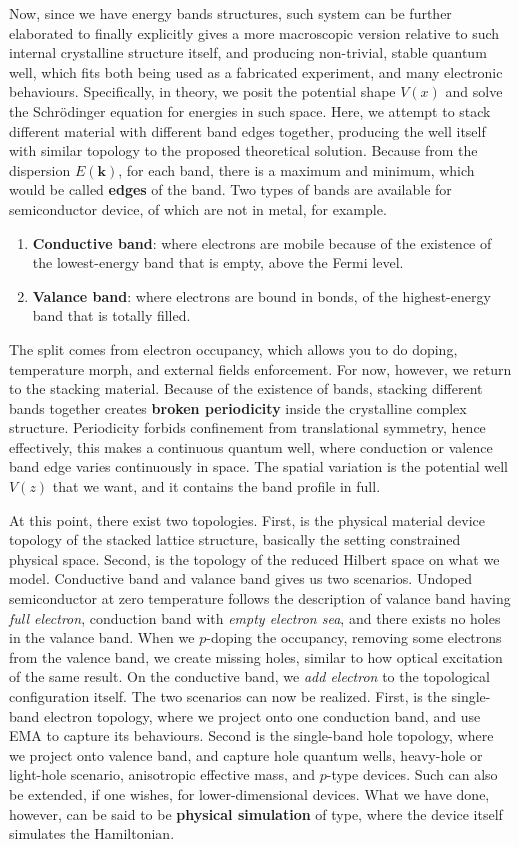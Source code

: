 \documentclass[%
 reprint,
 amsmath,amssymb,
 aps,
]{revtex4-2}
\begin{document}
Now, since we have energy bands structures, such system can be further elaborated to finally explicitly gives a more macroscopic version relative to such internal crystalline structure itself, and producing non-trivial, stable quantum well, which fits both being used as a fabricated experiment, and many electronic behaviours. Specifically, in theory, we posit the potential shape $V(x)$ and solve the Schrödinger equation for energies in such space. Here, we attempt to stack different material with different band edges together, producing the well itself with similar topology to the proposed theoretical solution. Because from the dispersion $E(\mathbf{k})$, for each band, there is a maximum and minimum, which would be called \textbf{edges} of the band. Two types of bands are available for semiconductor device, of which are not in metal, for example. 
\begin{enumerate}[itemsep=1pt,topsep=1pt]
    \item \textbf{Conductive band}: where electrons are mobile because of the existence of the lowest-energy band that is empty, above the Fermi level. 
    \item \textbf{Valance band}: where electrons are bound in bonds, of the highest-energy band that is totally filled. 
\end{enumerate}
The split comes from electron occupancy, which allows you to do doping, temperature morph, and external fields enforcement. For now, however, we return to the stacking material. Because of the existence of bands, stacking different bands together creates \textbf{broken periodicity} inside the crystalline complex structure. Periodicity forbids confinement from translational symmetry, hence effectively, this makes a continuous quantum well, where conduction or valence band edge varies continuously in space. The spatial variation is the potential well $V(z)$ that we want, and it contains the band profile in full. 

At this point, there exist two topologies. First, is the physical material device topology of the stacked lattice structure, basically the setting constrained physical space. Second, is the topology of the reduced Hilbert space on what we model. Conductive band and valance band gives us two scenarios. Undoped semiconductor at zero temperature follows the description of valance band having \textit{full electron}, conduction band with \textit{empty electron sea}, and there exists no holes in the valance band. When we $p$-doping the occupancy, removing some electrons from the valence band, we create missing holes, similar to how optical excitation of the same result. On the conductive band, we \textit{add electron} to the topological configuration itself. The two scenarios can now be realized. First, is the single-band electron topology, where we project onto one conduction band, and use EMA to capture its behaviours. Second is the single-band hole topology, where we project onto valence band, and capture hole quantum wells, heavy-hole or light-hole scenario, anisotropic effective mass, and $p$-type devices. Such can also be extended, if one wishes, for lower-dimensional devices. What we have done, however, can be said to be \textbf{physical simulation} of type, where the device itself simulates the Hamiltonian. 
\end{document}
